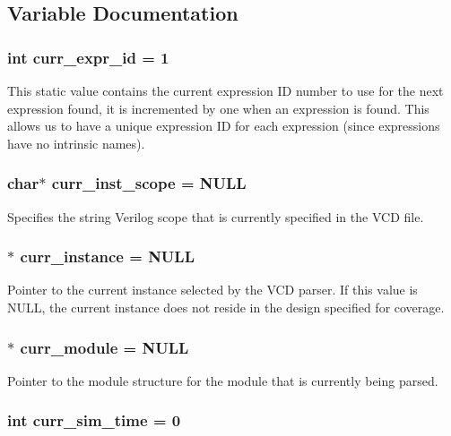 \subsection{Variable Documentation}
\subsubsection{\setlength{\rightskip}{0pt plus 5cm}int {\bf curr\_\-expr\_\-id} = 1}\label{db_8c_a17}


This static value contains the current expression ID number to use for the next expression found, it is incremented by one when an expression is found. This allows us to have a unique expression ID for each expression (since expressions have no intrinsic names). 
\subsubsection{\setlength{\rightskip}{0pt plus 5cm}char$\ast$ {\bf curr\_\-inst\_\-scope} = NULL}\label{db_8c_a12}


Specifies the string Verilog scope that is currently specified in the VCD file. 
\subsubsection{$\ast$ {\bf curr\_\-instance} = NULL}\label{db_8c_a13}


Pointer to the current instance selected by the VCD parser. If this value is NULL, the current instance does not reside in the design specified for coverage. 
\subsubsection{$\ast$ {\bf curr\_\-module} = NULL}\label{db_8c_a16}


Pointer to the module structure for the module that is currently being parsed. 
\subsubsection{\setlength{\rightskip}{0pt plus 5cm}int {\bf curr\_\-sim\_\-time} = 0}\label{db_8c_a18}


